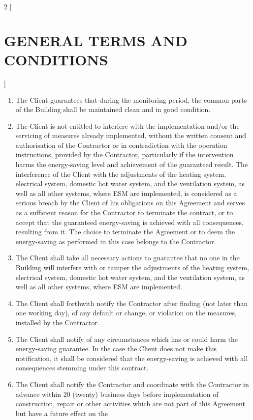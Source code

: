 \begin{multicols}{2} [\section{GENERAL TERMS AND CONDITIONS}]
\begin{enumerate}
    basements, attic, roof, storages for coal/wood and gas, electric
    and telecommunication panels, and boiler rooms).
  \item The Client guarantees that during the monitoring period, the
    common parts of the Building shall be maintained clean and in good
    condition.
  \item The Client is not entitled to interfere with the
    implementation and/or the servicing of measures already
    implemented, without the written consent and authorisation of the
    Contractor or in contradiction with the operation instructions,
    provided by the Contractor, particularly if the intervention harms
    the energy-saving level and achievement of the guaranteed
    result. The interference of the Client with the adjustments of the
    heating system, electrical system, domestic hot water system, and
    the ventilation system, as well as all other systems, where ESM
    are implemented, is considered as a serious breach by the Client
    of his obligations on this Agreement and serves as a sufficient
    reason for the Contractor to terminate the contract, or to accept
    that the guaranteed energy-saving is achieved with all
    consequences, resulting from it. The choice to terminate the
    Agreement or to deem the energy-saving as performed in this case
    belongs to the Contractor.
  \item The Client shall take all necessary actions to guarantee that
    no one in the Building will interfere with or tamper the
    adjustments of the heating system, electrical system, domestic hot
    water system, and the ventilation system, as well as all other
    systems, where ESM are implemented.
  \item The Client shall forthwith notify the Contractor after finding
    (not later than one working day), of any default or change, or
    violation on the measures, installed by the Contractor.
  \item The Client shall notify of any circumstances which has or
    could harm the energy-saving guarantee. In the case the Client
    does not make this notification, it shall be considered that the
    energy-saving is achieved with all consequences stemming under
    this contract.
  \item The Client shall notify the Contractor and coordinate with the
    Contractor in advance within 20 (twenty) business days before
    implementation of construction, repair or other activities which
    are not part of this Agreement but have a future effect on the

\end{enumerate}
\end{multicols}
